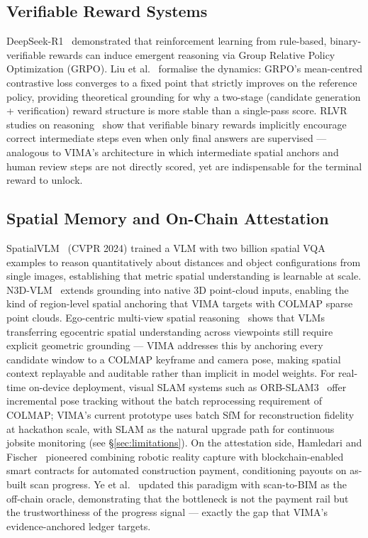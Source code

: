 \documentclass[sigconf,nonacm]{acmart}
\begin{document}
\subsection{Verifiable Reward Systems}

DeepSeek-R1~\cite{guo2025deepseekr1} demonstrated that reinforcement learning
from rule-based, binary-verifiable rewards can induce emergent reasoning via
Group Relative Policy Optimization (GRPO).
Liu et al.~\cite{liu2025grpo} formalise the dynamics: GRPO's mean-centred
contrastive loss converges to a fixed point that strictly improves on the
reference policy, providing theoretical grounding for why a two-stage (candidate
generation + verification) reward structure is more stable than a single-pass
score.
RLVR studies on reasoning~\cite{rlvr_reasoning2025} show that verifiable binary
rewards implicitly encourage correct intermediate steps even when only final
answers are supervised --- analogous to VIMA's architecture in which
intermediate spatial anchors and human review steps are not directly scored, yet
are indispensable for the terminal reward to unlock.

\subsection{Spatial Memory and On-Chain Attestation}

SpatialVLM~\cite{chen2024spatialvlm} (CVPR 2024) trained a VLM with two billion
spatial VQA examples to reason quantitatively about distances and object
configurations from single images, establishing that metric spatial understanding
is learnable at scale.
N3D-VLM~\cite{n3dvlm2024} extends grounding into native 3D point-cloud inputs,
enabling the kind of region-level spatial anchoring that VIMA targets with
COLMAP sparse point clouds.
Ego-centric multi-view spatial reasoning~\cite{egocentricmultiview2025} shows
that VLMs transferring egocentric spatial understanding across viewpoints still
require explicit geometric grounding --- VIMA addresses this by anchoring every
candidate window to a COLMAP keyframe and camera pose, making spatial context
replayable and auditable rather than implicit in model weights.
For real-time on-device deployment, visual SLAM systems such as
ORB-SLAM3~\cite{orbslam3_2021} offer incremental pose tracking without the
batch reprocessing requirement of COLMAP; VIMA's current prototype uses batch SfM
for reconstruction fidelity at hackathon scale, with SLAM as the natural upgrade
path for continuous jobsite monitoring (see \S\ref{sec:limitations}).
On the attestation side, Hamledari and Fischer~\cite{hamledari2021scan} pioneered
combining robotic reality capture with blockchain-enabled smart contracts for
automated construction payment, conditioning payouts on as-built scan progress.
Ye et al.~\cite{ye2025scantobim} updated this paradigm with scan-to-BIM as the
off-chain oracle, demonstrating that the bottleneck is not the payment rail but
the trustworthiness of the progress signal --- exactly the gap that VIMA's
evidence-anchored ledger targets.
\end{document}
